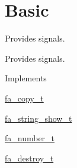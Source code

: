 \hypertarget{group___fa_signal_basic}{\section{Basic}
\label{group___fa_signal_basic}
}


Provides signals.  


Provides signals. \begin{DoxyParagraph}{Implements}

\begin{DoxyItemize}
\item \hyperlink{structfa__copy__t}{fa\-\_\-copy\-\_\-t}
\item \hyperlink{structfa__string__show__t}{fa\-\_\-string\-\_\-show\-\_\-t}
\item \hyperlink{structfa__number__t}{fa\-\_\-number\-\_\-t}
\item \hyperlink{structfa__destroy__t}{fa\-\_\-destroy\-\_\-t} 
\end{DoxyItemize}
\end{DoxyParagraph}
